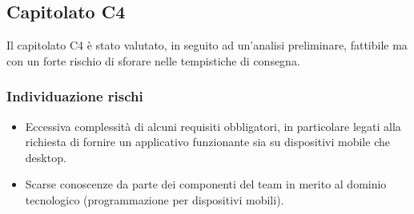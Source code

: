 \subsection{Capitolato C4}
Il capitolato C4 è stato valutato, in seguito ad un'analisi preliminare, fattibile ma con un forte rischio di sforare nelle tempistiche di consegna.

\subsubsection{Individuazione rischi}
\begin{itemize}
	\item Eccessiva complessità di alcuni requisiti obbligatori, in particolare legati alla richiesta di fornire un applicativo funzionante sia su dispositivi mobile che desktop.
	\item Scarse conoscenze da parte dei componenti del team in merito al dominio tecnologico (programmazione per dispositivi mobili).
\end{itemize}




